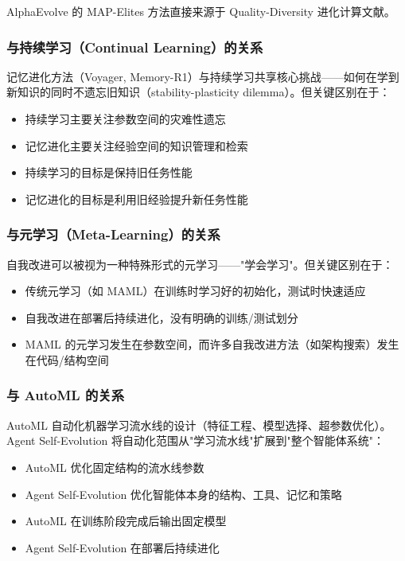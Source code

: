 AlphaEvolve 的 MAP-Elites 方法直接来源于 Quality-Diversity 进化计算文献。

\subsubsection{与持续学习（Continual Learning）的关系}

记忆进化方法（Voyager, Memory-R1）与持续学习共享核心挑战——如何在学到新知识的同时不遗忘旧知识（stability-plasticity dilemma）。但关键区别在于：
\begin{itemize}
\item 持续学习主要关注参数空间的灾难性遗忘
\item 记忆进化主要关注经验空间的知识管理和检索
\item 持续学习的目标是保持旧任务性能
\item 记忆进化的目标是利用旧经验提升新任务性能
\end{itemize}

\subsubsection{与元学习（Meta-Learning）的关系}

自我改进可以被视为一种特殊形式的元学习——"学会学习"。但关键区别在于：
\begin{itemize}
\item 传统元学习（如 MAML）在训练时学习好的初始化，测试时快速适应
\item 自我改进在部署后持续进化，没有明确的训练/测试划分
\item MAML 的元学习发生在参数空间，而许多自我改进方法（如架构搜索）发生在代码/结构空间
\end{itemize}

\subsubsection{与 AutoML 的关系}

AutoML 自动化机器学习流水线的设计（特征工程、模型选择、超参数优化）。Agent Self-Evolution 将自动化范围从"学习流水线"扩展到"整个智能体系统"：
\begin{itemize}
\item AutoML 优化固定结构的流水线参数
\item Agent Self-Evolution 优化智能体本身的结构、工具、记忆和策略
\item AutoML 在训练阶段完成后输出固定模型
\item Agent Self-Evolution 在部署后持续进化
\end{itemize}

